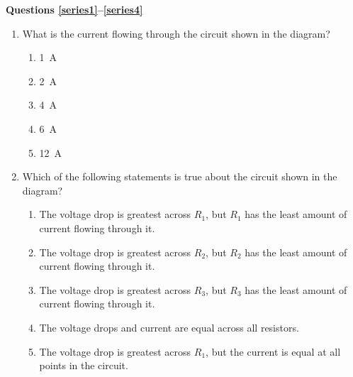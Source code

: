 \documentclass{../../../oss-classkick}
\begin{document}
\genheader


\genmultidirections

\gengravity

\raggedcolumns
\begin{multicols*}{2}

  \textbf{Questions \ref{series1}--\ref{series4}}  
  \begin{center}
  \end{center}
  \begin{enumerate}[leftmargin=18pt]
    
  \item What is the current flowing through the circuit shown in the diagram?
    \begin{enumerate}[nosep,leftmargin=18pt,label=(\Alph*)]
    \item\SI{1}{\ampere}
    \item\SI{2}{\ampere}
    \item\SI{4}{\ampere}
    \item\SI{6}{\ampere}
    \item\SI{12}{\ampere}
    \end{enumerate}
    \label{series1}
  \item Which of the following statements is true about the circuit shown in the
    diagram?
    \begin{enumerate}[nosep,leftmargin=18pt,label=(\Alph*)]  
    \item The voltage drop is greatest across $R_1$, but $R_1$ has the least
      amount of current flowing through it.
    \item The voltage drop is greatest across $R_2$, but $R_2$ has the least
      amount of current flowing through it.
    \item The voltage drop is greatest across $R_3$, but $R_3$ has the least
      amount of current flowing through it.
    \item The voltage drops and current are equal across all resistors.
    \item The voltage drop is greatest across $R_1$, but the current is equal at
      all points in the circuit.
    \end{enumerate}
    \vspace{.7in}
    

\end{enumerate}
\end{multicols*}
\end{document}
